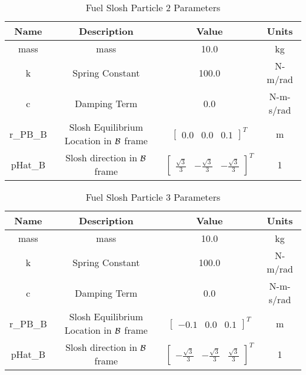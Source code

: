 \begin{table}[htbp]
	\caption{Fuel Slosh Particle 2 Parameters}
	\label{tab:slosh2}
	\centering \fontsize{10}{10}\selectfont
	\begin{tabular}{| c | c | c | c |} %
		\hline
		\textbf{Name}  & \textbf{Description}  & \textbf{Value} & \textbf{Units} \\
		\hline
		mass  & mass & 10.0 & kg \\
		\hline
		k & Spring Constant & 100.0 & N-m/rad \\
		\hline
		c & Damping Term & 0.0 & N-m-s/rad \\
		\hline
		r\_PB\_B & Slosh Equilibrium Location in $\cal{B}$ frame & $\begin{bmatrix}
		0.0 & 0.0 & 0.1 \end{bmatrix}^T$ & m \\
		\hline
		pHat\_B & Slosh direction in $\cal{B}$ frame & $\begin{bmatrix}
		\frac{\sqrt{3}}{3} & -\frac{\sqrt{3}}{3} & -\frac{\sqrt{3}}{3} \end{bmatrix}^T$ & 1 \\
		\hline
	\end{tabular}
\end{table}

\begin{table}[htbp]
	\caption{Fuel Slosh Particle 3 Parameters}
	\label{tab:slosh3}
	\centering \fontsize{10}{10}\selectfont
	\begin{tabular}{| c | c | c | c |} %
		\hline
		\textbf{Name}  & \textbf{Description}  & \textbf{Value} & \textbf{Units} \\
		\hline
		mass  & mass & 10.0 & kg \\
		\hline
		k & Spring Constant & 100.0 & N-m/rad \\
		\hline
		c & Damping Term & 0.0 & N-m-s/rad \\
		\hline
		r\_PB\_B & Slosh Equilibrium Location in $\cal{B}$ frame & $\begin{bmatrix}
		-0.1 & 0.0 & 0.1 \end{bmatrix}^T$ & m \\
		\hline
		pHat\_B & Slosh direction in $\cal{B}$ frame & $\begin{bmatrix}
		-\frac{\sqrt{3}}{3} & -\frac{\sqrt{3}}{3} & \frac{\sqrt{3}}{3} \end{bmatrix}^T$ & 1 \\
		\hline
	\end{tabular}
\end{table}

